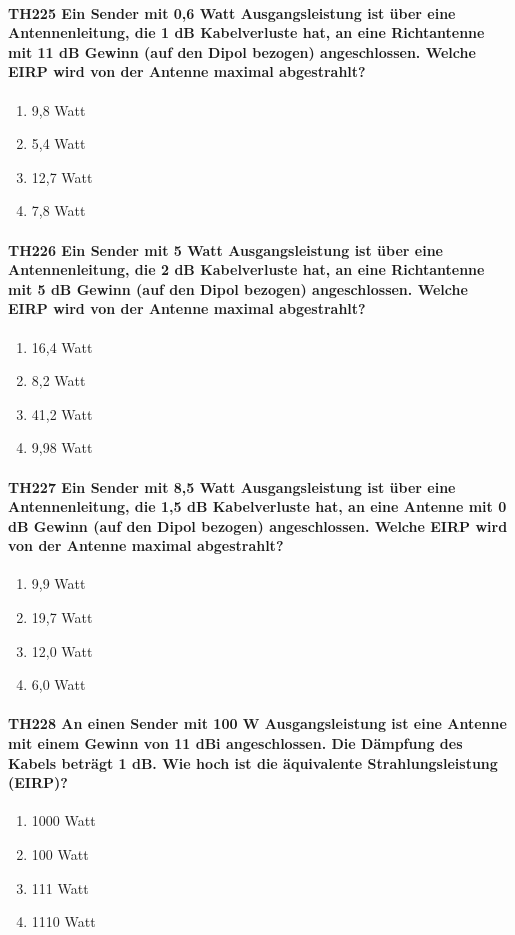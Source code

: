 \documentclass[8pt]{article}
\begin{document}
\paragraph*{TH225 Ein Sender mit 0,6 Watt Ausgangsleistung ist über eine Antennenleitung, die 1 dB Kabelverluste hat, an eine Richtantenne mit 11 dB Gewinn (auf den Dipol bezogen) angeschlossen. Welche EIRP wird von der Antenne maximal abgestrahlt?}
\begin{enumerate}[nolistsep,label=\Alph*]
\item 9,8 Watt
\item 5,4 Watt
\item 12,7 Watt
\item 7,8 Watt
\end{enumerate}

\paragraph*{TH226 Ein Sender mit 5 Watt Ausgangsleistung ist über eine Antennenleitung, die 2 dB Kabelverluste hat, an eine Richtantenne mit 5 dB Gewinn (auf den Dipol bezogen) angeschlossen. Welche EIRP wird von der Antenne maximal abgestrahlt?}
\begin{enumerate}[nolistsep,label=\Alph*]
\item 16,4 Watt
\item 8,2 Watt
\item 41,2 Watt
\item 9,98 Watt
\end{enumerate}

\paragraph*{TH227 Ein Sender mit 8,5 Watt Ausgangsleistung ist über eine Antennenleitung, die 1,5 dB Kabelverluste hat, an eine Antenne mit 0 dB Gewinn (auf den Dipol bezogen) angeschlossen. Welche EIRP wird von der Antenne maximal abgestrahlt?}
\begin{enumerate}[nolistsep,label=\Alph*]
\item 9,9 Watt
\item 19,7 Watt
\item 12,0 Watt
\item 6,0 Watt
\end{enumerate}

\paragraph*{TH228 An einen Sender mit 100 W Ausgangsleistung ist eine Antenne mit einem Gewinn von 11 dBi angeschlossen. Die Dämpfung des Kabels beträgt 1 dB. Wie hoch ist die äquivalente Strahlungsleistung (EIRP)?}
\begin{enumerate}[nolistsep,label=\Alph*]
\item 1000 Watt
\item 100 Watt
\item 111 Watt
\item 1110 Watt
\end{enumerate}
\end{document}
